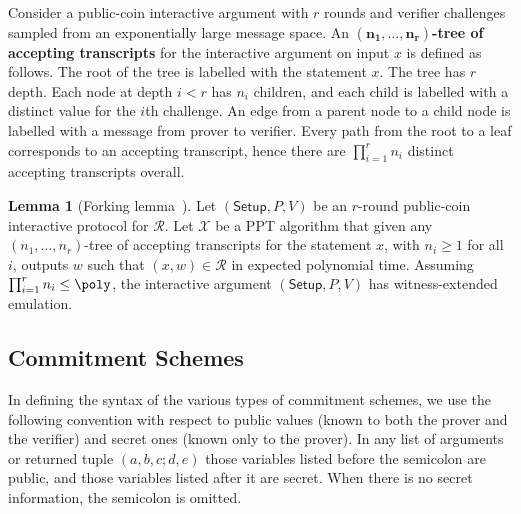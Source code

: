 \documentclass{article}
\theoremstyle{definition}
\newtheorem{lemma}{Lemma}
\begin{document}
Consider a public-coin interactive argument with $r$ rounds and verifier challenges sampled from an exponentially large message space. An \textbf{$\mathbf{(n_1,...,n_r)}$-tree of accepting transcripts} for the interactive argument on input $x$ is defined as follows. The root of the tree is labelled with the statement $x$. The tree has $r$ depth. Each node at depth $i < r$ has $n_i$ children, and each child is labelled with a distinct value for the $i$th challenge. An edge from a parent node to a child node is labelled with a message from prover to verifier. Every path from the root to a leaf corresponds to an accepting transcript, hence there are $\prod_{i=1}^r n_i$ distinct accepting transcripts overall. 

\begin{lemma}[Forking lemma~\cite{EC:BCCGP16}] 
\label{lem:forking}
Let $(\textsf{Setup}, P, V)$ be an $r$-round public-coin interactive protocol for $\mathcal{R}$. Let $\mathcal{X}$ be a PPT algorithm that given any $(n_1,...,n_r)$-tree of accepting transcripts for the statement $x$, with $n_i \geq 1$ for all $i$, outputs $w$ such that $(x, w) \in \mathcal{R}$ in expected polynomial time. Assuming $\prod_{i=1}^r n_i \leq \poly$, the interactive argument $(\textsf{Setup}, P, V)$ has witness-extended emulation. 
\end{lemma}

\subsection{Commitment Schemes}

In defining the syntax of the various types of commitment schemes, we use the following convention with respect to public values (known to both the prover and the verifier) and secret ones (known only to the prover). In any list of arguments or returned tuple $(a, b, c; d, e)$ those variables listed before the semicolon are public, and those variables listed after it are secret. When there is no secret information, the semicolon is omitted.
\end{document}
